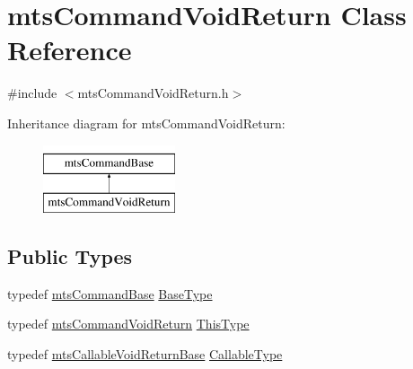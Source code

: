 \hypertarget{classmts_command_void_return}{\section{mts\-Command\-Void\-Return Class Reference}
\label{classmts_command_void_return}
}


{\ttfamily \#include $<$mts\-Command\-Void\-Return.\-h$>$}

Inheritance diagram for mts\-Command\-Void\-Return\-:\begin{figure}[H]
\begin{center}
\leavevmode
\includegraphics[height=2.000000cm]{d2/d20/classmts_command_void_return}
\end{center}
\end{figure}
\subsection*{Public Types}
\begin{DoxyCompactItemize}
\item 
typedef \hyperlink{classmts_command_base}{mts\-Command\-Base} \hyperlink{classmts_command_void_return_a41ef4fa87ecb46aec2235730bdcc1088}{Base\-Type}
\item 
typedef \hyperlink{classmts_command_void_return}{mts\-Command\-Void\-Return} \hyperlink{classmts_command_void_return_ae77b9e228137e3c73a41fbd1f38ee7fd}{This\-Type}
\item 
typedef \hyperlink{classmts_callable_void_return_base}{mts\-Callable\-Void\-Return\-Base} \hyperlink{classmts_command_void_return_a101cc8bc0761aa0ab210c4f6d59ad81c}{Callable\-Type}
\end{DoxyCompactItemize}
